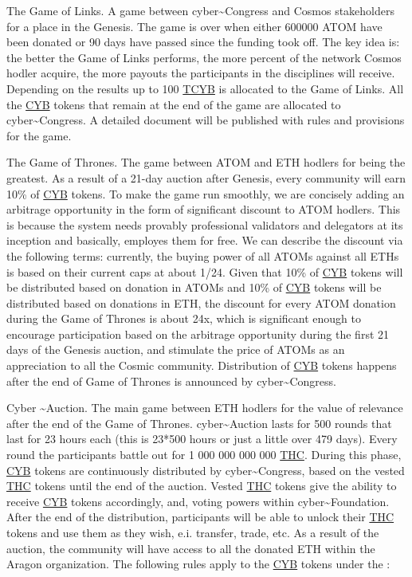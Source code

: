 \documentclass[8pt,oneside]{amsart}
\newcommand{\linkgreen}[2]{\href{#1}{\color{green}{#2}}}
\begin{document}
The Game of Links. A game between cyber\~{}Congress and Cosmos stakeholders for a place in the Genesis. The game is over when either 600000 ATOM have been donated or 90 days have passed since the funding took off. The key idea is: the better the Game of Links performs, the more percent of the network Cosmos hodler acquire, the more payouts the participants in the disciplines will receive. Depending on the results up to 100 {\hyperref[cyb]{TCYB}} is allocated to the Game of Links. All the {\hyperref[cyb]{CYB}} tokens that remain at the end of the game are allocated to cyber\~{}Congress. A detailed document will be published with rules and provisions for the game.

The Game of Thrones. The game between ATOM and ETH hodlers for being the greatest. As a result of a 21-day auction after Genesis, every community will earn 10\% of {\hyperref[cyb]{CYB}} tokens. To make the game run smoothly, we are concisely adding an arbitrage opportunity in the form of significant discount to ATOM hodlers. This is because the system needs provably professional validators and delegators at its inception and basically, employes them for free. We can describe the discount via the following terms: currently, the buying power of all ATOMs against all ETHs is based on their current caps at about 1/24. Given that 10\% of {\hyperref[cyb]{CYB}} tokens will be distributed based on donation in ATOMs and 10\% of {\hyperref[cyb]{CYB}} tokens will be distributed based on donations in ETH, the discount for every ATOM donation during the Game of Thrones is about 24x, which is significant enough to encourage participation based on the arbitrage opportunity during the first 21 days of the Genesis auction, and stimulate the price of ATOMs as an appreciation to all the Cosmic community. Distribution of {\hyperref[cyb]{CYB}} tokens happens after the end of Game of Thrones is announced by cyber\~{}Congress.

Cyber \~{}Auction. The main game between ETH hodlers for the value of relevance after the end of the Game of Thrones. cyber\~{}Auction lasts for 500 rounds that last for 23 hours each (this is 23*500 hours or just a little over 479 days). Every round the participants battle out for 1 000 000 000 000 {\hyperref[thc]{THC}}. During this phase, {\hyperref[cyb]{CYB}} tokens are continuously distributed by cyber\~{}Congress, based on the vested {\hyperref[thc]{THC}} tokens until the end of the auction. Vested {\hyperref[thc]{THC}} tokens give the ability to receive {\hyperref[cyb]{CYB}} tokens accordingly, and, voting powers within cyber\~{}Foundation. After the end of the distribution, participants will be able to unlock their {\hyperref[thc]{THC}} tokens and use them as they wish, e.i. transfer, trade, etc. As a result of the auction, the community will have access to all the donated ETH within the Aragon organization. The following rules apply to the {\hyperref[cyb]{CYB}} tokens under the \linkgreen{https://cyber.page/network/cyber/contract/cyber147drnke9676972jr3anklkj7pzgwjw47cp2u7j}{multisig for distribution}:
\end{document}
